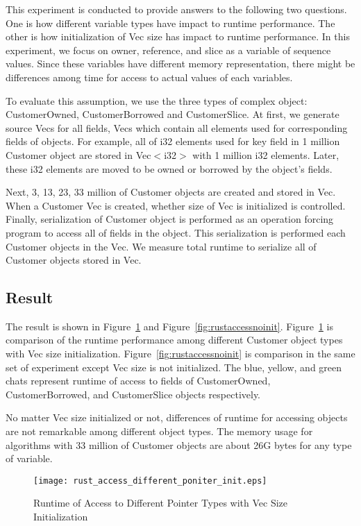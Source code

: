 This experiment is conducted to provide answers to the following two questions. One is how different variable types have impact to runtime performance.
The other is how initialization of Vec size has impact to runtime performance. 
In this experiment, we focus on owner, reference, and slice as a variable of sequence values. 
Since these variables have different memory representation, there might be differences among time for access to actual values of each variables.

To evaluate this assumption, we use the three types of complex object: CustomerOwned, CustomerBorrowed and CustomerSlice. 
At first, we generate source Vecs for all fields, Vecs which contain all elements used for corresponding fields of objects.
For example, all of i32 elements used for key field in 1 million Customer object are stored in Vec$<$i32$>$ with 1 million i32 elements. 
Later, these i32 elements are moved to be owned or borrowed by the object's fields.

Next, 3, 13, 23, 33 million of Customer objects are created and stored in Vec. 
When a Customer Vec is created, whether size of Vec is initialized is controlled. 
Finally, serialization of Customer object is performed as an operation forcing program to access all of fields in the object.
This serialization is performed each Customer objects in the Vec. We measure total runtime to serialize all of Customer objects 
stored in Vec. 

\subsection{Result}
\label{sec:history}
The result is shown in Figure~\ref{fig:rustaccessinit} and Figure~\ref{fig:rustaccessnoinit}.
Figure~\ref{fig:rustaccessinit} is comparison of the runtime performance among different Customer object types with Vec size initialization.
Figure~\ref{fig:rustaccessnoinit} is comparison in the same set of experiment except Vec size is not initialized. 
The blue, yellow, and green chats represent runtime of access to fields of CustomerOwned, CustomerBorrowed, and CustomerSlice objects respectively.

No matter Vec size initialized or not, differences of runtime for accessing objects are not remarkable among different object types. 
The memory usage for algorithms with 33 million of Customer objects are about 26G bytes for any type of variable.

\begin{figure}[htb]
    \texttt{[image: rust\_access\_different\_poniter\_init.eps]}
    \caption{Runtime of Access to Different Pointer Types with Vec Size Initialization}
    \label{fig:rustaccessinit}
\end{figure}

